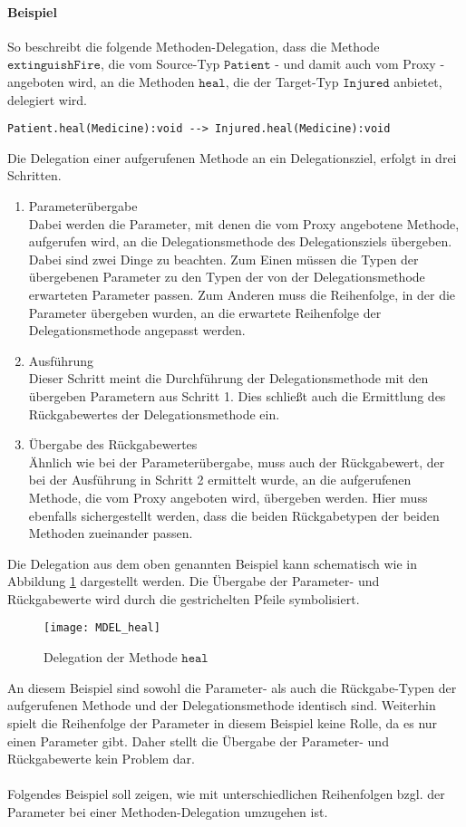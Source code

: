 \paragraph{Beispiel} So beschreibt die folgende Methoden-Delegation, dass die Methode $\texttt{extinguishFire}$, die vom Source-Typ $\texttt{Patient}$ - und damit auch vom Proxy - angeboten wird, an die Methoden $\texttt{heal}$, die der Target-Typ $\texttt{Injured}$ anbietet, delegiert wird.
\begin{lstlisting}[style = dsl, caption = Einfache Methoden-Delegation, captionpos = b]
	Patient.heal(Medicine):void --> Injured.heal(Medicine):void
\end{lstlisting}
\noindent
Die Delegation einer aufgerufenen Methode an ein Delegationsziel, erfolgt in drei Schritten.
\begin{enumerate}
\item Parameterübergabe\\
Dabei werden die Parameter, mit denen die vom Proxy angebotene Methode, aufgerufen wird, an die Delegationsmethode des Delegationsziels übergeben. Dabei sind zwei Dinge zu beachten. Zum Einen müssen die Typen der übergebenen Parameter zu den Typen der von der Delegationsmethode erwarteten Parameter passen. Zum Anderen muss die Reihenfolge, in der die Parameter übergeben wurden, an die erwartete Reihenfolge der Delegationsmethode angepasst werden.
\item Ausführung\\
Dieser Schritt meint die Durchführung der Delegationsmethode mit den übergeben Parametern aus Schritt 1. Dies schließt auch die Ermittlung des Rückgabewertes der Delegationsmethode ein.
\item Übergabe des Rückgabewertes\\
Ähnlich wie bei der Parameterübergabe, muss auch der Rückgabewert, der bei der Ausführung in Schritt 2 ermittelt wurde, an die aufgerufenen Methode, die vom Proxy angeboten wird, übergeben werden. Hier muss ebenfalls sichergestellt werden, dass die beiden Rückgabetypen der beiden Methoden zueinander passen.
\end{enumerate}
Die Delegation aus dem oben genannten Beispiel kann schematisch wie in Abbildung \ref{fig:DEL_heal} dargestellt werden. Die Übergabe der Parameter- und Rückgabewerte wird durch die gestrichelten Pfeile symbolisiert.
\begin{figure}[h!]
\texttt{[image: MDEL\_heal]}
\caption{Delegation der Methode $\texttt{heal}$}
\label{fig:DEL_heal}
\end{figure}
\noindent
An diesem Beispiel sind sowohl die Parameter- als auch die Rückgabe-Typen der aufgerufenen Methode und der Delegationsmethode identisch sind. Weiterhin spielt die Reihenfolge der Parameter in diesem Beispiel keine Rolle, da es nur einen Parameter gibt. Daher stellt die Übergabe der Parameter- und Rückgabewerte kein Problem dar.\\\\
Folgendes Beispiel soll zeigen, wie mit unterschiedlichen Reihenfolgen bzgl. der Parameter bei einer Methoden-Delegation umzugehen ist.
